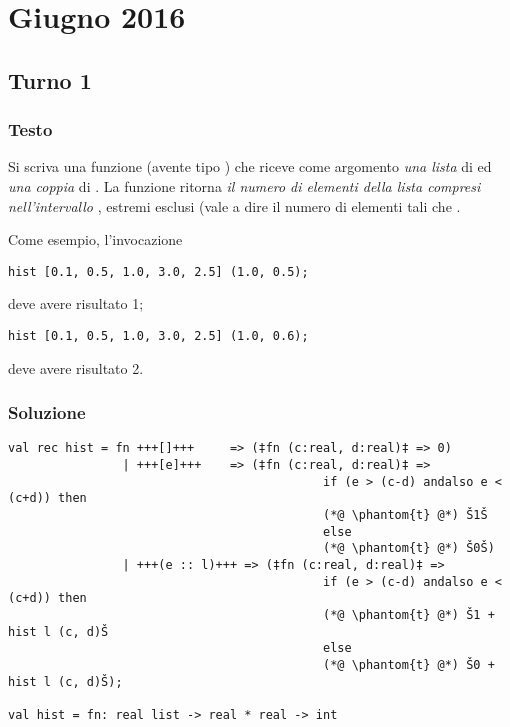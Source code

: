 \section{Giugno 2016}

\subsection{Turno 1}

\subsubsection{Testo}

Si scriva una funzione  (avente tipo ) che riceve come argomento \emph{una lista} di  ed \emph{una coppia} di .
La funzione  ritorna \emph{il numero di elementi della lista compresi nell'intervallo }, estremi esclusi (vale a dire il numero di elementi  tali che .

\medskip
Come esempio, l'invocazione
\begin{lstlisting}[style = SML, frame = none]
hist [0.1, 0.5, 1.0, 3.0, 2.5] (1.0, 0.5);
\end{lstlisting}
deve avere risultato 1;
\begin{lstlisting}[style = SML, frame = none]
hist [0.1, 0.5, 1.0, 3.0, 2.5] (1.0, 0.6);
\end{lstlisting}
deve avere risultato 2.

\subsubsection{Soluzione}

\begin{lstlisting}[style = SML, caption = {Definizione della funzione \sml{hist}}]
val rec hist = fn +++[]+++	   => (‡fn (c:real, d:real)‡ => 0)
				| +++[e]+++	   => (‡fn (c:real, d:real)‡ =>
											if (e > (c-d) andalso e < (c+d)) then
							 				(*@ \phantom{t} @*) Š1Š
											else
											(*@ \phantom{t} @*) Š0Š)
				| +++(e :: l)+++ => (‡fn (c:real, d:real)‡ =>
											if (e > (c-d) andalso e < (c+d)) then
											(*@ \phantom{t} @*) Š1 + hist l (c, d)Š
											else
											(*@ \phantom{t} @*) Š0 + hist l (c, d)Š);

val hist = fn: real list -> real * real -> int
\end{lstlisting}

